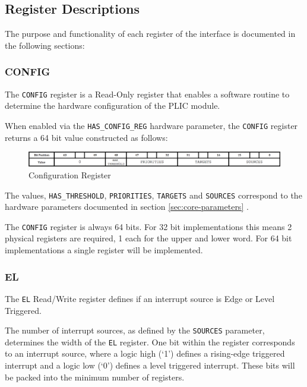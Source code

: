 \subsection{Register Descriptions}

The purpose and functionality of each register of the interface is documented in the following sections:

\subsubsection{CONFIG}

The \texttt{CONFIG} register is a Read-Only register that enables a
software routine to determine the hardware configuration of the PLIC
module.

When enabled via the \texttt{HAS\_CONFIG\_REG} hardware parameter, the
\texttt{CONFIG} register returns a 64 bit value constructed as follows:

\begin{figure}[h] 
	\includegraphics[width=\linewidth]{assets/img/CONFIG} 
	\caption[Configuration Register]{Configuration Register}
	\label{fig:configreg}
\end{figure}

The values, \texttt{HAS\_THRESHOLD}, \texttt{PRIORITIES},
\texttt{TARGETS} and \texttt{SOURCES} correspond to the hardware
parameters documented in section \ref{sec:core-parameters} .

The \texttt{CONFIG} register is always 64 bits. For 32 bit
implementations this means 2 physical registers are required, 1 each for
the upper and lower word. For 64 bit implementations a single register
will be implemented.

\subsubsection{EL}

The \texttt{EL} Read/Write register defines if an interrupt source is
Edge or Level Triggered.

The number of interrupt sources, as defined by the
\texttt{SOURCES} parameter, determines the width of the \texttt{EL} register. 
One bit within the register corresponds to an interrupt source, where a 
logic high (`1') defines a rising-edge triggered interrupt and a logic 
low (`0') defines a level triggered interrupt. These bits will be
packed into the minimum number of registers.

